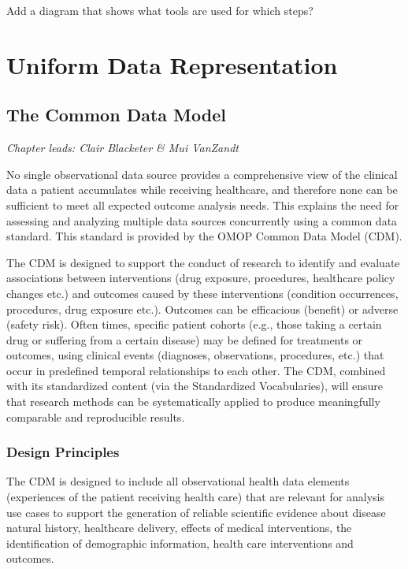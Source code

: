 \documentclass[]{book}
\begin{document}
Add a diagram that shows what tools are used for which steps?

\part{Uniform Data
Representation}\label{part-uniform-data-representation}

\chapter{The Common Data Model}\label{CommonDataModel}

\emph{Chapter leads: Clair Blacketer \& Mui VanZandt}

No single observational data source provides a comprehensive view of the
clinical data a patient accumulates while receiving healthcare, and
therefore none can be sufficient to meet all expected outcome analysis
needs. This explains the need for assessing and analyzing multiple data
sources concurrently using a common data standard. This standard is
provided by the OMOP Common Data Model (CDM).

The CDM is designed to support the conduct of research to identify and
evaluate associations between interventions (drug exposure, procedures,
healthcare policy changes etc.) and outcomes caused by these
interventions (condition occurrences, procedures, drug exposure etc.).
Outcomes can be efficacious (benefit) or adverse (safety risk). Often
times, specific patient cohorts (e.g., those taking a certain drug or
suffering from a certain disease) may be defined for treatments or
outcomes, using clinical events (diagnoses, observations, procedures,
etc.) that occur in predefined temporal relationships to each other. The
CDM, combined with its standardized content (via the Standardized
Vocabularies), will ensure that research methods can be systematically
applied to produce meaningfully comparable and reproducible results.

\section{Design Principles}\label{design-principles}

The CDM is designed to include all observational health data elements
(experiences of the patient receiving health care) that are relevant for
analysis use cases to support the generation of reliable scientific
evidence about disease natural history, healthcare delivery, effects of
medical interventions, the identification of demographic information,
health care interventions and outcomes.
\end{document}
